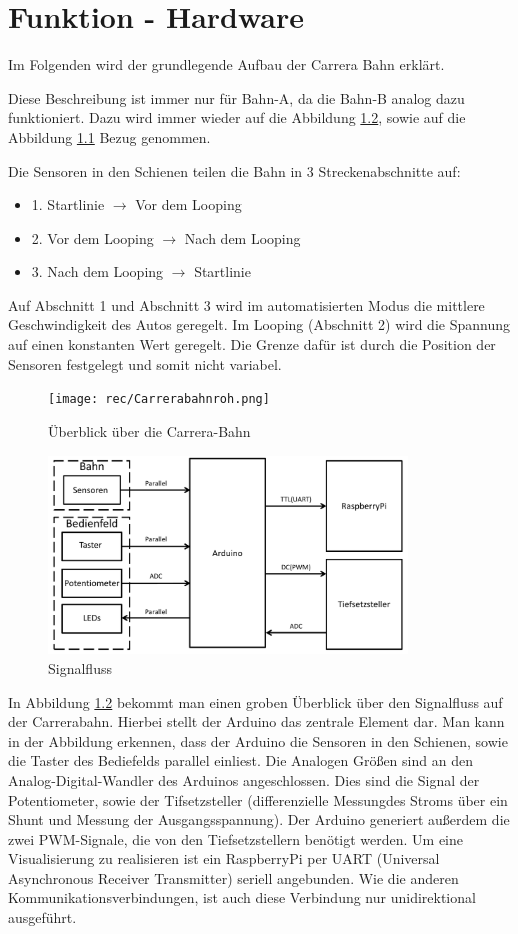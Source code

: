 \documentclass[a4paper, 11pt]{report}
\begin{document}
\chapter{Funktion - Hardware}
	Im Folgenden wird der grundlegende Aufbau der Carrera Bahn erklärt.

	Diese Beschreibung ist immer nur für Bahn-A, da die
	Bahn-B analog dazu funktioniert. Dazu wird immer wieder auf die Abbildung \ref{img:signalfluss}, sowie auf die \\Abbildung
	\ref{img:carrerakomplett} Bezug genommen.

	Die Sensoren in den Schienen teilen die Bahn in 3 Streckenabschnitte auf:
	\begin{itemize}
		\item{1.} Startlinie $\rightarrow$ Vor dem Looping
		\item{2.} Vor dem Looping $\rightarrow$ Nach dem Looping
		\item{3.} Nach dem Looping $\rightarrow$ Startlinie
	\end{itemize}
	Auf Abschnitt 1 und Abschnitt 3 wird im automatisierten Modus die mittlere Geschwindigkeit des Autos geregelt.
	Im Looping (Abschnitt 2) wird die Spannung auf einen konstanten Wert geregelt.
	Die Grenze dafür ist durch die Position der Sensoren festgelegt und somit nicht variabel.
	\begin{figure}[ht]
	\centering
	\texttt{[image: rec/Carrerabahnroh.png]}
	\caption{Überblick über die Carrera-Bahn}
	\label{img:carrerakomplett}
	\end{figure}
	\begin{figure}[ht]
		\centering
		\includegraphics[width=0.85\textwidth]{rec/signalfluss.pdf}
		\caption{Signalfluss}
		\label{img:signalfluss}
	\end{figure}
	In Abbildung \ref{img:signalfluss} bekommt man einen groben Überblick über den Signalfluss auf der Carrerabahn. Hierbei stellt der Arduino das zentrale Element dar. Man kann in der Abbildung erkennen, dass der Arduino die Sensoren in den Schienen, sowie die Taster des Bediefelds parallel einliest. Die Analogen Größen sind an den Analog-Digital-Wandler des Arduinos angeschlossen. Dies sind die Signal der Potentiometer, sowie der Tifsetzsteller (differenzielle Messungdes Stroms über ein Shunt und Messung der Ausgangsspannung). Der Arduino generiert außerdem die zwei PWM-Signale, die von den Tiefsetzstellern benötigt werden. Um eine Visualisierung zu realisieren ist ein RaspberryPi per UART (Universal Asynchronous Receiver Transmitter) seriell angebunden. Wie die anderen Kommunikationsverbindungen, ist auch diese Verbindung nur unidirektional ausgeführt.
\end{document}
